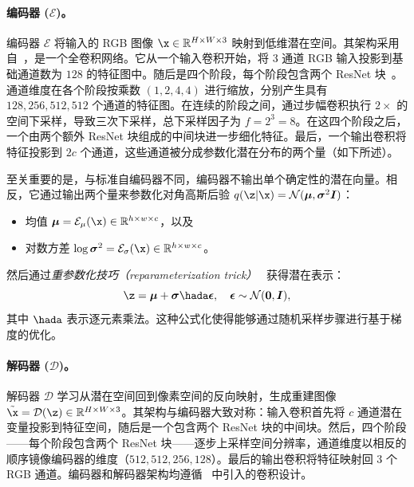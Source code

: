 \documentclass[../../book-main_zh.tex]{subfiles}
\begin{document}
\paragraph{编码器 ($\mathcal{E}$)。}
编码器 $\mathcal{E}$ 将输入的 RGB 图像 $\x \in \mathbb{R}^{H \times W \times 3}$ 映射到低维潜在空间。其架构采用自~\citep{esser2021taming}，是一个全卷积网络。它从一个输入卷积开始，将 3 通道 RGB 输入投影到基础通道数为 $128$ 的特征图中。随后是四个阶段，每个阶段包含两个 ResNet 块~\citep{he2016deep}。通道维度在各个阶段按乘数 $(1, 2, 4, 4)$ 进行缩放，分别产生具有 $128, 256, 512, 512$ 个通道的特征图。在连续的阶段之间，通过步幅卷积执行 $2\times$ 的空间下采样，导致三次下采样，总下采样因子为 $f = 2^3 = 8$。在这四个阶段之后，一个由两个额外 ResNet 块组成的中间块进一步细化特征。最后，一个输出卷积将特征投影到 $2c$ 个通道，这些通道被分成参数化潜在分布的两个量（如下所述）。

至关重要的是，与标准自编码器不同，编码器不输出单个确定性的潜在向量。相反，它通过输出两个量来参数化对角高斯后验 $q(\z | \x) = \mathcal{N}(\boldsymbol{\mu}, \boldsymbol{\sigma}^2 \boldsymbol{I})$：
\begin{itemize}
    \item 均值 $\boldsymbol{\mu} = \mathcal{E}_\mu(\x) \in \mathbb{R}^{h \times w \times c}$，以及
    \item 对数方差 $\log \boldsymbol{\sigma}^2 = \mathcal{E}_\sigma(\x) \in \mathbb{R}^{h \times w \times c}$。
\end{itemize}
然后通过\emph{重参数化技巧（reparameterization trick）}~\citep{kingma2013auto} 获得潜在表示：
\begin{equation}
    \z = \boldsymbol{\mu} + \boldsymbol{\sigma} \hada \boldsymbol{\epsilon}, \quad \boldsymbol{\epsilon} \sim \mathcal{N}(\boldsymbol{0}, \boldsymbol{I}),
\end{equation}
其中 $\hada$ 表示逐元素乘法。这种公式化使得能够通过随机采样步骤进行基于梯度的优化。

\paragraph{解码器 ($\mathcal{D}$)。}
解码器 $\mathcal{D}$ 学习从潜在空间回到像素空间的反向映射，生成重建图像 $\tilde{\x} = \mathcal{D}(\z) \in \mathbb{R}^{H \times W \times 3}$。其架构与编码器大致对称：输入卷积首先将 $c$ 通道潜在变量投影到特征空间，随后是一个包含两个 ResNet 块的中间块。然后，四个阶段——每个阶段包含两个 ResNet 块——逐步上采样空间分辨率，通道维度以相反的顺序镜像编码器的维度（$512, 512, 256, 128$）。最后的输出卷积将特征映射回 3 个 RGB 通道。编码器和解码器架构均遵循~\citep{esser2021taming} 中引入的卷积设计。
\end{document}
